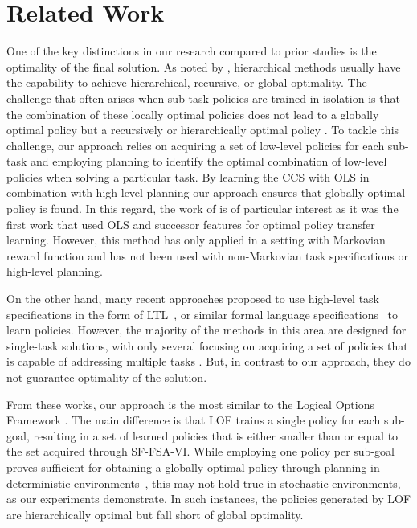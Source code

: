 \section{Related Work}
One of the key distinctions in our research compared to prior studies is the optimality of the final solution. As noted by \citet{Dietterich2000}, hierarchical methods usually have the capability to achieve hierarchical, recursive, or global optimality. The challenge that often arises when sub-task policies are trained in isolation is that the combination of these locally optimal policies does not lead to a globally optimal policy but a recursively \cite{Dayan1992} or hierarchically optimal policy \cite{Sutton1999, mann2015approximate, Araki2021}.  To tackle this challenge, our approach relies on acquiring a set of low-level policies for each sub-task and employing planning to identify the optimal combination of low-level policies when solving a particular task. By learning the CCS with OLS \citep{roijers2014linear} in combination with high-level planning our approach ensures that globally optimal policy is found. In this regard, the work of \citet{Alegre2022} is of particular interest as it was the first work that used OLS and successor features \cite{Barreto2017} for optimal policy transfer learning. However, this method has only applied in a setting with Markovian reward function and has not been used with non-Markovian task specifications or high-level planning. 

On the other hand, many recent approaches proposed to use high-level task specifications in the form of LTL~\citep{Icarte2018b, kuo2020encoding, Vaezipoor2021, Jothimurugan2021}, or similar formal language specifications~\citep{ToroIcarte2019,Camacho2019, Araki2021, Icarte2022} to learn policies. However, the majority of the methods in this area are designed for single-task solutions, with only several focusing on acquiring a set of policies that is capable of addressing multiple tasks \cite{Icarte2018b, Leon2020, kuo2020encoding, Araki2021, Vaezipoor2021}. But, in contrast to our approach, they do not guarantee optimality of the solution.

From these works, our approach is the most similar to the Logical Options Framework \cite{Araki2021}. The main difference is that LOF trains a single policy for each sub-goal, resulting in a set of learned policies that is either smaller than or equal to the set acquired through SF-FSA-VI. While employing one policy per sub-goal proves sufficient for obtaining a globally optimal policy through planning in deterministic environments~\citep{Wen2020}, this may not hold true in stochastic environments, as our experiments demonstrate. In such instances, the policies generated by LOF are hierarchically optimal but fall short of global optimality.


